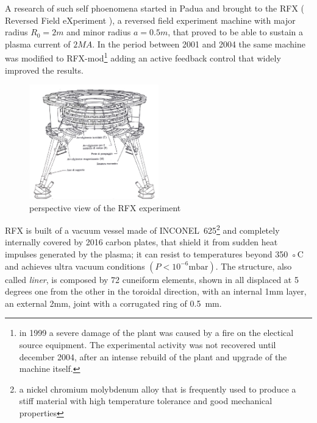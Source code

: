 A research of such self phoenomena started in Padua and brought to the RFX ( Reversed Field eXperiment ), a reversed field experiment machine with major radius $R_0 = 2m$ and minor radius $a = 0.5m$, that proved to be able to sustain a plasma current of $2MA$. In the period between 2001 and 2004 the same machine was modified to RFX-mod\footnote{in 1999 a severe damage of the plant was caused by a fire on the electical source equipment. The experimental activity was not recovered until december 2004, after an intense rebuild of the plant and upgrade of the machine itself.} adding an active feedback control that widely improved the results.
\begin{figure}[ht!]
\centering
\includegraphics[width=0.5\textwidth]{img/rfx2}
\caption{ perspective view of the RFX experiment }
\label{img:rfx}
\end{figure}
%
RFX is built of a vacuum vessel made of INCONEL~625\footnote{a nickel chromium molybdenum alloy that is frequently used to produce a stiff material with high temperature tolerance and good mechanical properties} and completely internally covered by 2016 carbon plates, that shield it from sudden heat impulses generated by the plasma; it can resist to temperatures beyond 350 ◦C and achieves ultra vacuum conditions $(P < 10^{-6} \text{mbar})$.
The structure, also called \textit{liner}, is composed by 72 cuneiform elements, shown in \Figure{\ref{fig:rfx_liner}} all displaced at 5 degrees one from the other in the toroidal direction, with an internal 1mm layer, an external 2mm, joint with a corrugated ring of 0.5~mm.
